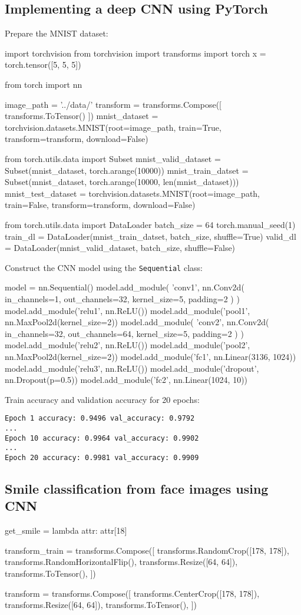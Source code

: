 \subsection{Implementing a deep CNN using PyTorch}
Prepare the MNIST dataset:
\begin{pythoncode}
import torchvision
from torchvision import transforms
import torch
x = torch.tensor([5, 5, 5])

from torch import nn

image_path = '../data/'
transform = transforms.Compose([
    transforms.ToTensor()
])
mnist_dataset = torchvision.datasets.MNIST(root=image_path, train=True, transform=transform, download=False)

from torch.utils.data import Subset
mnist_valid_dataset = Subset(mnist_dataset, torch.arange(10000))
mnist_train_datset = Subset(mnist_dataset, torch.arange(10000, len(mnist_dataset)))
mnist_test_dataset = torchvision.datasets.MNIST(root=image_path, train=False, transform=transform, download=False)

from torch.utils.data import DataLoader
batch_size = 64
torch.manual_seed(1)
train_dl = DataLoader(mnist_train_datset, batch_size, shuffle=True)
valid_dl = DataLoader(mnist_valid_dataset, batch_size, shuffle=False)
\end{pythoncode}

Construct the CNN model using the \texttt{Sequential} class:
\begin{pythoncode}
model = nn.Sequential()
model.add_module(
    'conv1',
    nn.Conv2d(
        in_channels=1, out_channels=32, kernel_size=5, padding=2
    )
)
model.add_module('relu1', nn.ReLU())
model.add_module('pool1', nn.MaxPool2d(kernel_size=2))
model.add_module(
    'conv2',
    nn.Conv2d(
        in_channels=32, out_channels=64, kernel_size=5, padding=2
    )
)
model.add_module('relu2', nn.ReLU())
model.add_module('pool2', nn.MaxPool2d(kernel_size=2))
model.add_module('fc1', nn.Linear(3136, 1024))
model.add_module('relu3', nn.ReLU())
model.add_module('dropout', nn.Dropout(p=0.5))
model.add_module('fc2', nn.Linear(1024, 10))
\end{pythoncode}

Train accuracy and validation accuracy for 20 epochs:
\begin{verbatim}
Epoch 1 accuracy: 0.9496 val_accuracy: 0.9792
...
Epoch 10 accuracy: 0.9964 val_accuracy: 0.9902
...
Epoch 20 accuracy: 0.9981 val_accuracy: 0.9909
\end{verbatim}

\subsection{Smile classification from face images using CNN}
\begin{pythoncode}
get_smile = lambda attr: attr[18]

transform_train = transforms.Compose([
    transforms.RandomCrop([178, 178]),
    transforms.RandomHorizontalFlip(),
    transforms.Resize([64, 64]),
    transforms.ToTensor(),
])

transform = transforms.Compose([
    transforms.CenterCrop([178, 178]),
    transforms.Resize([64, 64]),
    transforms.ToTensor(),
])
\end{pythoncode}

